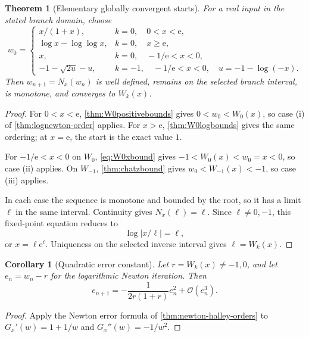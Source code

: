 \documentclass[11pt]{article}
\newtheorem{theorem}{Theorem}[section]
\newtheorem{corollary}[corollary]{Corollary}
\theoremstyle{remark}
\newcommand{\ee}{\mathrm e}
\newcommand{\bigO}{\mathcal O}
\newcommand{\abs}[1]{\left|#1\right|}
\begin{document}
\begin{theorem}[Elementary globally convergent starts]\label{thm:globalstarts}
For a real input in the stated branch domain, choose
\begin{equation}\label{eq:globalstarts}
 w_0=
 \begin{cases}
  x/(1+x),&k=0,\quad 0<x<\ee,\\
  \log x-\log\log x,&k=0,\quad x\geq\ee,\\
  x,&k=0,\quad -1/\ee<x<0,\\
  -1-\sqrt{2u}-u,&k=-1,\quad
       -1/\ee<x<0,\quad u=-1-\log(-x).
 \end{cases}
\end{equation}
Then \(w_{n+1}=N_x(w_n)\) is well defined, remains on the selected branch
interval, is monotone, and converges to \(W_k(x)\).
\end{theorem}

\begin{proof}
For \(0<x<\ee\), \cref{thm:W0positivebounds} gives
\(0<w_0<W_0(x)\), so case (i) of
\cref{thm:lognewton-order} applies.  For \(x>\ee\),
\cref{thm:W0logbounds} gives the same ordering; at \(x=\ee\), the start is
the exact value \(1\).

For \(-1/\ee<x<0\) on \(W_0\), \eqref{eq:W0xbound} gives
\(-1<W_0(x)<w_0=x<0\), so case (ii) applies.  On \(W_{-1}\),
\cref{thm:chatzbound} gives
\(w_0<W_{-1}(x)<-1\), so case (iii) applies.

In each case the sequence is monotone and bounded by the root, so it has a
limit \(\ell\) in the same interval.  Continuity gives
\(N_x(\ell)=\ell\).  Since \(\ell\neq0,-1\), this fixed-point equation
reduces to
\[
       \log\abs{x/\ell}=\ell,
\]
or \(x=\ell\ee^\ell\).  Uniqueness on the selected inverse interval gives
\(\ell=W_k(x)\).
\end{proof}

\begin{corollary}[Quadratic error constant]\label{cor:lognewton-local}
Let \(r=W_k(x)\neq-1,0\), and let \(e_n=w_n-r\) for the logarithmic Newton
iteration.  Then
\begin{equation}\label{eq:lognewton-error}
 e_{n+1}
 =-\frac{1}{2r(1+r)}e_n^2+\bigO(e_n^3).
\end{equation}
\end{corollary}

\begin{proof}
Apply the Newton error formula of
\cref{thm:newton-halley-orders} to
\(G_x'(w)=1+1/w\) and \(G_x''(w)=-1/w^2\).
\end{proof}
\end{document}
